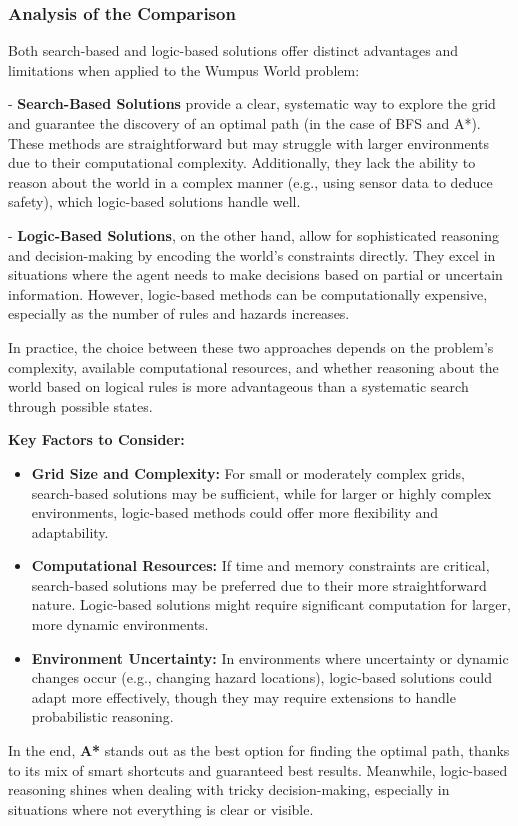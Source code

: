 \documentclass[12pt]{article}
\begin{document}
\subsubsection{Analysis of the Comparison}
Both search-based and logic-based solutions offer distinct advantages and limitations when applied to the Wumpus World problem:

- \textbf{Search-Based Solutions} provide a clear, systematic way to explore the grid and guarantee the discovery of an optimal path (in the case of BFS and A*). These methods are straightforward but may struggle with larger environments due to their computational complexity. Additionally, they lack the ability to reason about the world in a complex manner (e.g., using sensor data to deduce safety), which logic-based solutions handle well.

- \textbf{Logic-Based Solutions}, on the other hand, allow for sophisticated reasoning and decision-making by encoding the world’s constraints directly. They excel in situations where the agent needs to make decisions based on partial or uncertain information. However, logic-based methods can be computationally expensive, especially as the number of rules and hazards increases.

In practice, the choice between these two approaches depends on the problem's complexity, available computational resources, and whether reasoning about the world based on logical rules is more advantageous than a systematic search through possible states.

\textbf{Key Factors to Consider:}
\begin{itemize}
    \item \textbf{Grid Size and Complexity:} For small or moderately complex grids, search-based solutions may be sufficient, while for larger or highly complex environments, logic-based methods could offer more flexibility and adaptability.
    \item \textbf{Computational Resources:} If time and memory constraints are critical, search-based solutions may be preferred due to their more straightforward nature. Logic-based solutions might require significant computation for larger, more dynamic environments.
    \item \textbf{Environment Uncertainty:} In environments where uncertainty or dynamic changes occur (e.g., changing hazard locations), logic-based solutions could adapt more effectively, though they may require extensions to handle probabilistic reasoning.
\end{itemize}
In the end, \textbf{A*} stands out as the best option for finding the optimal path, thanks to its mix of smart shortcuts and guaranteed best results. Meanwhile, logic-based reasoning shines when dealing with tricky decision-making, especially in situations where not everything is clear or visible.
\newpage
\end{document}
